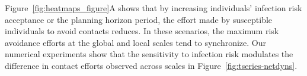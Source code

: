 \documentclass[9pt,twocolumn,twoside]{pnas-new}
\begin{document}
%
Figure~\ref{fig:heatmaps_figure}A shows that by increasing individuals' infection risk acceptance or the planning horizon period, the effort made by susceptible individuals to avoid contacts reduces. In these scenarios, the maximum risk avoidance efforts at the global and local scales tend to synchronize.
%
%
%
%
%
Our numerical experiments show that
the sensitivity to infection risk modulates the difference in contact efforts observed across scales in Figure~\ref{fig:tseries-netdyns}.

\end{document}
